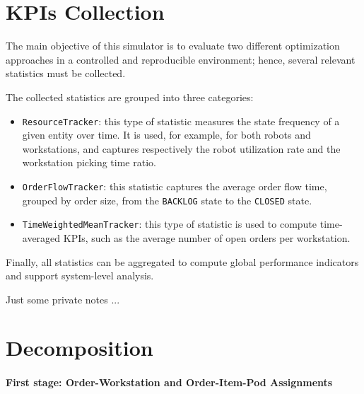 \documentclass[a4paper,10pt]{article}
\begin{document}
\newpage \clearpage
\section{KPIs Collection}
The main objective of this simulator is to evaluate two different optimization approaches in a controlled and reproducible environment; hence, several relevant statistics must be collected.

The collected statistics are grouped into three categories:
\begin{itemize}
    \item \texttt{ResourceTracker}: this type of statistic measures the state frequency of a given entity over time. It is used, for example, for both robots and workstations, and captures respectively the robot utilization rate and the workstation picking time ratio.
    \item \texttt{OrderFlowTracker}: this statistic captures the average order flow time, grouped by order size, from the \texttt{BACKLOG} state to the \texttt{CLOSED} state.
    \item \texttt{TimeWeightedMeanTracker}: this type of statistic is used to compute time-averaged KPIs, such as the average number of open orders per workstation.
\end{itemize}

Finally, all statistics can be aggregated to compute global performance indicators and support system-level analysis.



\newpage
Just some private notes ... 
\section{Decomposition}

\paragraph{First stage: Order-Workstation and Order-Item-Pod Assignments}
\end{document}

